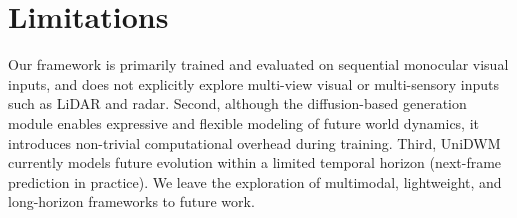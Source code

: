 \documentclass{article}
\theoremstyle{plain}
\theoremstyle{definition}
\theoremstyle{remark}
\begin{document}
\section{Limitations} 
Our framework is primarily trained and evaluated on sequential monocular visual inputs, and does not explicitly explore multi-view visual or multi-sensory inputs such as LiDAR and radar. Second, although the diffusion-based generation module enables expressive and flexible modeling of future world dynamics, it introduces non-trivial computational overhead during training. Third, UniDWM currently models future evolution within a limited temporal horizon (next-frame prediction in practice). We leave the exploration of multimodal, lightweight, and long-horizon frameworks to future work.


\end{document}
